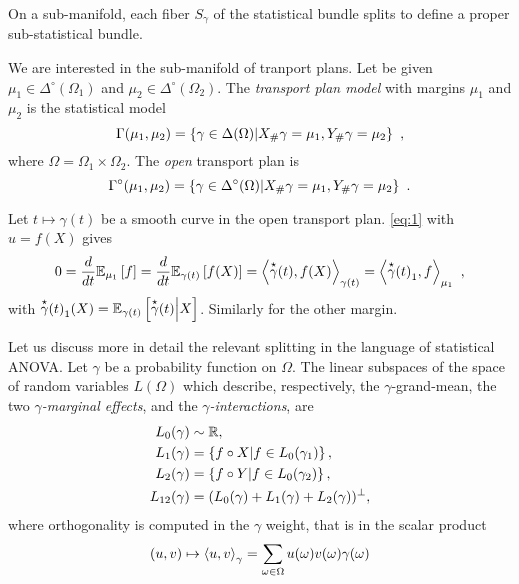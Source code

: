 \documentclass[runningheads]{llncs}
\begin{document}
On a sub-manifold, each fiber $S_\gamma$ of the
statistical bundle splits to define a proper sub-statistical bundle. 

We are interested in the sub-manifold of tranport plans. Let be given
$\mu_1 \in \Delta^\circ(\Omega_1)$ and $\mu_2 \in
\Delta^\circ(\Omega_2)$. The \emph{transport plan model} with margins $\mu_1$ and $\mu_2$ is the statistical model
%
  \begin{equation*}
    \Gamma(\mu_1,\mu_2) = \setof{\gamma \in \Delta(\Omega)}{X_\# \gamma = \mu_1, Y_\# \gamma = \mu_2} \ ,
  \end{equation*}
%
where $\Omega=\Omega_1 \times \Omega_2$. The \emph{open} transport plan is 
%
  \begin{equation*}
    \Gamma^\circ(\mu_1,\mu_2) = \setof{\gamma \in \Delta^\circ(\Omega)}{X_\# \gamma = \mu_1, Y_\# \gamma = \mu_2} \ .
  \end{equation*}

  Let $t \mapsto \gamma(t)$ be a smooth curve in the open transport
  plan. \cref{eq:1} with $u = f(X)$ gives
  \begin{equation*}
  0 = \derivby t \expectat {\mu_1} f =  \derivby t \expectat
  {\gamma(t)} {f(X)} = \scalarat {\gamma(t)} {\velocity \gamma(t)}
  {f(X)} = \scalarat {\mu_1} {{\velocity \gamma(t)}_1} f \ , 
  \end{equation*}
with ${\velocity \gamma(t)}_1(X) = \condexpectat {\gamma(t)} {\velocity
  \gamma(t)} X$. Similarly for the other margin.

Let us discuss more in detail the relevant splitting in the language
of statistical ANOVA. Let $\gamma$ be
a probability function on $\Omega$. The linear subspaces of the space
of random variables $L(\Omega)$ which describe, respectively, the
$\gamma$-grand-mean, the two \emph{$\gamma$-marginal effects}, and
the \emph{$\gamma$-interactions}, are
%
\begin{equation}\label{eq:ANOVA-spaces}
\begin{aligned}
  L_0(\gamma) &\sim \reals, \\
  L_1(\gamma) &= \setof{f\circ X}{f \in L_0(\gamma_1)},\\
  L_2(\gamma) &= \setof{f\circ Y}{f \in L_0(\gamma_2)},\\
  L_{12}(\gamma) &= (L_0(\gamma) + L_1(\gamma) + L_2(\gamma))^\perp,
\end{aligned}
\end{equation}
%
where orthogonality is computed in the $\gamma$ weight, that is in the scalar product
\begin{equation*}
  (u,v) \mapsto \scalarat \gamma u v = \sum_{\omega\in\Omega}u(\omega)v(\omega)
  \gamma(\omega)\end{equation*}
\end{document}
